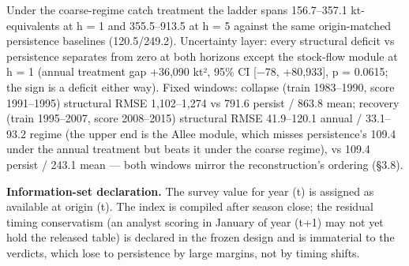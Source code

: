 \documentclass[11pt]{article}
\begin{document}
Under the coarse-regime catch treatment the ladder spans 156.7--357.1
kt-equivalents at h = 1 and 355.5--913.5 at h = 5 against the same
origin-matched persistence baselines (120.5/249.2). Uncertainty layer:
every structural deficit vs persistence separates from zero at both
horizons except the stock-flow module at h = 1 (annual treatment gap
+36,090 kt², 95\% CI {[}−78, +80,933{]}, p = 0.0615; the sign is a
deficit either way). Fixed windows: collapse (train 1983--1990, score
1991--1995) structural RMSE 1,102--1,274 vs 791.6 persist / 863.8 mean;
recovery (train 1995--2007, score 2008--2015) structural RMSE
41.9--120.1 annual / 33.1--93.2 regime (the upper end is the Allee
module, which misses persistence's 109.4 under the annual treatment but
beats it under the coarse regime), vs 109.4 persist / 243.1 mean ---
both windows mirror the reconstruction's ordering (§3.8).

\textbf{Information-set declaration.} The survey value for year (t) is
assigned as available at origin (t). The index is compiled after season
close; the residual timing conservatism (an analyst scoring in January
of year (t+1) may not yet hold the released table) is declared in the
frozen design and is immaterial to the verdicts, which lose to
persistence by large margins, not by timing shifts.
\end{document}
